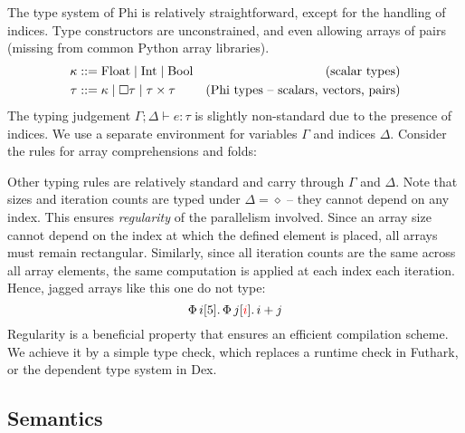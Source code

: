 The type system of Phi is relatively straightforward, except for the handling of indices. Type constructors are unconstrained, and even allowing arrays of pairs (missing from common Python array libraries).
\begin{align*}
\kappa &::= \phifloattype \mid \phiinttype \mid \phibooltype & \text{(scalar types)} \\
\tau &::= \kappa \mid \phivectype{\tau} \mid \phipairtype{\tau}{\tau} & \text{(Phi types -- scalars, vectors, pairs)}
\end{align*}
The typing judgement $\Gamma; \Delta \vdash e : \tau$ is slightly non-standard due to the presence of indices. We use a separate environment for variables $\Gamma$ and indices $\Delta$. Consider the rules for array comprehensions and folds:
\begin{center}
    \begin{prooftree}[center=false]
    \end{prooftree} \quad
    \begin{prooftree}[center=false]
    \end{prooftree}
\end{center}
Other typing rules are relatively standard and carry through $\Gamma$ and $\Delta$. Note that sizes and iteration counts are typed under $\Delta = \diamond$ -- they cannot depend on any index. This ensures \textit{regularity} of the parallelism involved. Since an array size cannot depend on the index at which the defined element is placed, all arrays must remain rectangular. Similarly, since all iteration counts are the same across all array elements, the same computation is applied at each index each iteration. Hence, jagged arrays like this one do not type:
$$ \phivec{i}{5}{\phivec{j}{\textcolor{red}{i}}{i + j}} $$
Regularity is a beneficial property that ensures an efficient compilation scheme. We achieve it by a simple type check, which replaces a runtime check in Futhark, or the dependent type system in Dex. 

\subsection{Semantics}

